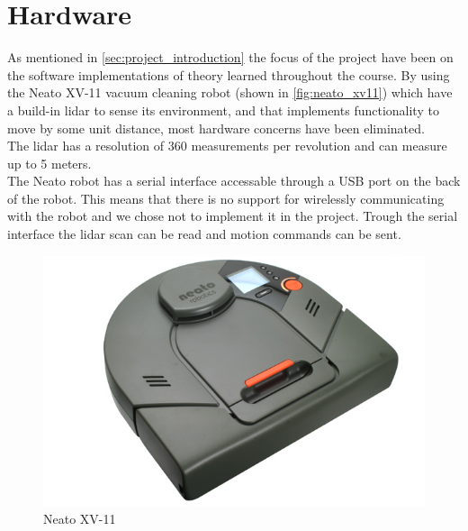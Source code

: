 
\section{Hardware} %
\label{sec:hardware}

As mentioned in \autoref{sec:project_introduction} the focus of the project have been on the software implementations of theory learned throughout the course.
By using the Neato XV-11 vacuum cleaning robot (shown in \autoref{fig:neato_xv11}) which have a build-in lidar to sense its environment, and that implements functionality to move by some unit distance, most hardware concerns have been eliminated.\\

The lidar has a resolution of 360 measurements per revolution and can measure up to 5 meters.\\

The Neato robot has a serial interface accessable through a USB port on the back of the robot. This means that there is no support for wirelessly communicating with the robot and we chose not to implement it in the project. Trough the serial interface the lidar scan can be read and motion commands can be sent.

\begin{figure}[H]
\centering
\includegraphics[scale=0.40]{images/neato_xv11}
\caption{Neato XV-11}
\label{fig:neato_xv11}
\end{figure}

